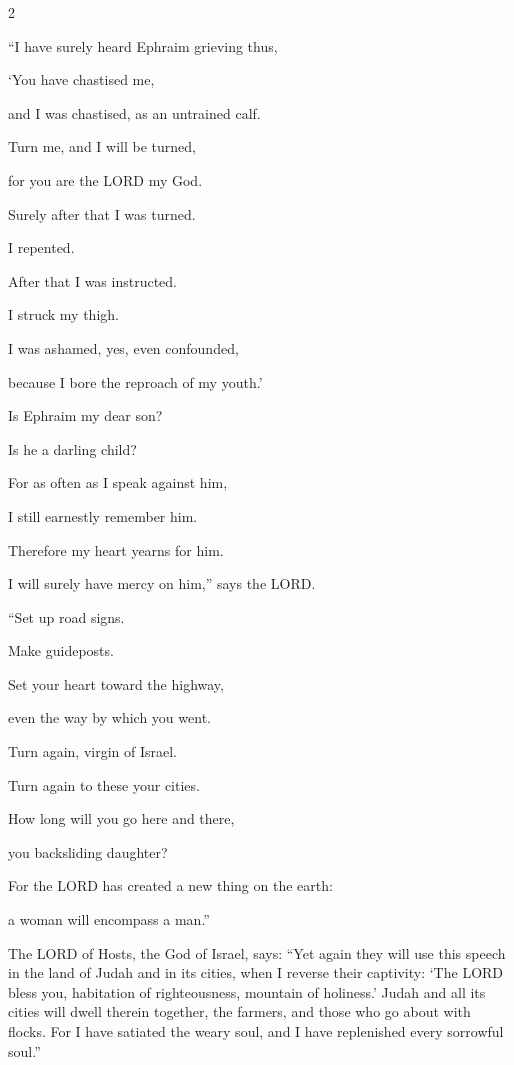 \begin{multicols}{2}
\vspace{\baselineskip}

\myverse{}“I have surely heard Ephraim grieving thus,

‘You have chastised me,

and I was chastised, as an untrained calf.

Turn me, and I will be turned,

for you are the LORD my God.


\myverse{}Surely after that I was turned.

I repented.

After that I was instructed.

I struck my thigh.

I was ashamed, yes, even confounded,

because I bore the reproach of my youth.’


\myverse{}Is Ephraim my dear son?

Is he a darling child?

For as often as I speak against him,

I still earnestly remember him.

Therefore my heart yearns for him.

I will surely have mercy on him,” says the LORD.

\vspace{\baselineskip}

\myverse{}“Set up road signs.

Make guideposts.

Set your heart toward the highway,

even the way by which you went.

Turn again, virgin of Israel.

Turn again to these your cities.


\myverse{}How long will you go here and there,

you backsliding daughter?

For the LORD has created a new thing on the earth:

a woman will encompass a man.”
		\end{multicols}
			
\vspace{\baselineskip}
			
\myverse{}The LORD of Hosts, the God of Israel, says: “Yet again they will use this speech in the land of Judah and in its cities, when I reverse their captivity: ‘The LORD bless you, habitation of righteousness, mountain of holiness.’ \myverse{}Judah and all its cities will dwell therein together, the farmers, and those who go about with flocks. \myverse{}For I have satiated the weary soul, and I have replenished every sorrowful soul.”


